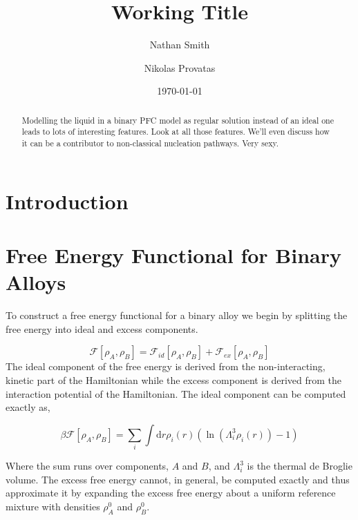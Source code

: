 \documentclass[showkeys, prb, reprint]{revtex4-1}
\newcommand{\F}{\mathcal{F}}
\newcommand{\A}{\rho_A}
\newcommand{\B}{\rho_B}
\renewcommand{\d}{\mathrm{d}}
\renewcommand{\l}{\left}
\renewcommand{\r}{\right}
\begin{document}

\title{Working Title}
\author{Nathan Smith}
\author{Nikolas Provatas}
\date{\today}

\begin{abstract}

Modelling the liquid in a binary PFC model as regular solution instead of an ideal one leads to lots of interesting features. Look at all those features. We'll even discuss how it can be a contributor to non-classical nucleation pathways. Very sexy.

\end{abstract}


\maketitle


\section{Introduction}

\section{Free Energy Functional for Binary Alloys}

To construct a free energy functional for a binary alloy we begin by splitting the free energy into ideal and excess components.

\begin{equation}
	\mathcal{F}[\A, \B] = \F_{id}[\A, \B] + \F_{ex}[\A, \B]
\end{equation}
The ideal component of the free energy is derived from the non-interacting, kinetic part of the Hamiltonian while the excess component is derived from the interaction potential of the Hamiltonian. The ideal component can be computed exactly as, 

\begin{equation}
	\beta\F[\A, \B] = \sum_{i}\int \d r \rho_i(r) \l(\ln\l(\Lambda_i^3\rho_i(r)\r) -1 \r)
\end{equation}

Where the sum runs over components, $A$ and $B$, and $\Lambda_i^3$ is the thermal de Broglie volume. The excess free energy cannot, in general, be computed exactly and thus approximate it by expanding the excess free energy about a uniform reference mixture with densities $\A^0$ and $\B^0$.
\end{document}
